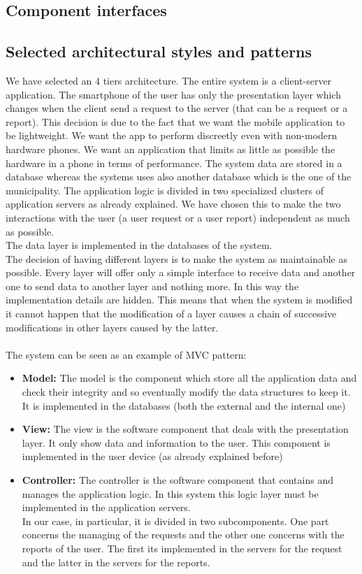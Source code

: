 \documentclass[titlepage]{article}
\begin{document}
\subsection{Component interfaces}
\subsection{Selected architectural styles and patterns}
We have selected an 4 tiers architecture. The entire system is a client-server application. The smartphone of the user has only the presentation layer which changes when the client send a request to the server (that can be a request or a report). This decision is due to the fact that we want the mobile application to be lightweight. We want the app to perform discreetly even with non-modern hardware phones. We want an application that limits as little as possible the hardware in a phone in terms of performance. The system data are stored in a database  whereas the systems uses also another database which is the one of the municipality.
The application logic is divided in two specialized clusters of application servers as already explained. We have chosen this to make the two interactions with the user (a user request or a user report) independent as much as possible.\\
 The data layer is implemented in the databases of the system.\\
The decision of having different layers is to make the system as maintainable as possible. Every layer will offer only a simple interface to receive data and another one to send data to another layer and nothing more. In this way the implementation details are hidden. This means that when the system is modified it cannot happen that the modification of a layer causes a chain of successive modifications in other layers caused by the latter.\\ \\
The system can be seen as an example of MVC pattern:
\begin{itemize}
	 \item \textbf{Model:} The model is the component which store all the application data and check their integrity and so eventually modify the data structures to keep it. It is implemented in the databases (both the external and the internal one)
	 \item \textbf{View:} The view is the software component that deals with the presentation layer. It only show data and information to the user. This component is implemented in the user device (as already explained before)
	 \item \textbf{Controller:} The controller is the software component that contains and manages the application logic. In this system this logic layer must be implemented in the application servers. \\
In our case, in particular, it is divided in two subcomponents. One part concerns the managing of the requests and the other one concerns with the reports of the user. The first its implemented in the servers for the request and the latter in the servers for the reports.
\end{itemize}
\end{document}
